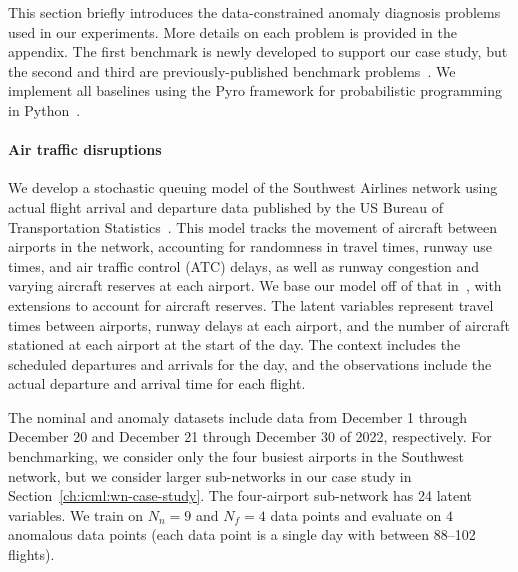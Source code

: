 This section briefly introduces the data-constrained anomaly diagnosis problems used in our experiments. More details on each problem is provided in the appendix. The first benchmark is newly developed to support our case study, but the second and third are previously-published benchmark problems~\cite{keipourALFADatasetUAV2021,dengOpenFWILargescaleMultistructural2022}. We implement all baselines using the Pyro framework for probabilistic programming in Python~\cite{binghamPyroDeepUniversal2019}.

\paragraph{Air traffic disruptions} We develop a stochastic queuing model of the Southwest Airlines network using actual flight arrival and departure data published by the US Bureau of Transportation Statistics~\cite{bureauoftransportationstatisticsTranStatsDepartmentTransportation}. This model tracks the movement of aircraft between airports in the network, accounting for randomness in travel times, runway use times, and air traffic control (ATC) delays, as well as runway congestion and varying aircraft reserves at each airport. We base our model off of that in~\cite{pyrgiotisModellingDelayPropagation2013}, with extensions to account for aircraft reserves. The latent variables represent travel times between airports, runway delays at each airport, and the number of aircraft stationed at each airport at the start of the day. The context includes the scheduled departures and arrivals for the day, and the observations include the actual departure and arrival time for each flight.

The nominal and anomaly datasets include data from December 1 through December 20 and December 21 through December 30 of 2022, respectively. For benchmarking, we consider only the four busiest airports in the Southwest network, but we consider larger sub-networks in our case study in Section~\ref{ch:icml:wn-case-study}. The four-airport sub-network has 24 latent variables. We train on $N_n = 9$ and $N_f = 4$ data points and evaluate on $4$ anomalous data points (each data point is a single day with between 88--102 flights).

